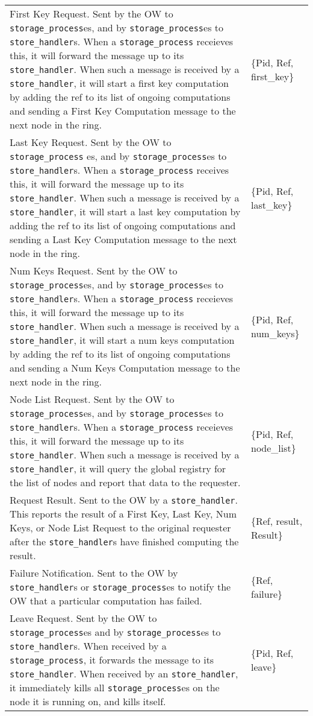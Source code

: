 \documentclass[12pt,letterpaper]{article}
\renewcommand{\tt}[1]{\texttt{#1}}
\newcommand{\sh}{\tt{store\_handler}}
\renewcommand{\sp}{\tt{storage\_process}}
\begin{document}
\begin{longtable}{p{4.5in}T}
First Key Request. Sent by the OW to \sp es, and by \sp es to \sh s. When a \sp{} receieves this, it will forward the message up to its \sh. When such a message is received by a \sh, it will start a first key computation by adding the ref to its list of ongoing computations and sending a First Key Computation message to the next node in the ring. &
\{Pid, Ref, first\_key\} \\

Last Key Request. Sent by the OW to \sp{} es, and by \sp es to \sh s. When a \sp{} receives this, it will forward the message up to its \sh. When such a message is received by a \sh, it will start a last key computation by adding the ref to its list of ongoing computations and sending a Last Key Computation message to the next node in the ring. &
\{Pid, Ref, last\_key\} \\

Num Keys Request. Sent by the OW to \sp es, and by \sp es to \sh s. When a \sp{} receieves this, it will forward the message up to its \sh. When such a message is received by a \sh, it will start a num keys computation by adding the ref to its list of ongoing computations and sending a Num Keys Computation message to the next node in the ring. &
\{Pid, Ref, num\_keys\} \\

Node List Request. Sent by the OW to \sp es, and by \sp es to \sh s. When a \sp{} receieves this, it will forward the message up to its \sh.  When such a message is received by a \sh, it will query the global registry for the list of nodes and report that data to the requester. &
\{Pid, Ref, node\_list\} \\

Request Result. Sent to the OW by a \sh. This reports the result of a First Key, Last Key, Num Keys, or Node List Request to the original requester after the \sh s have finished computing the result. &
\{Ref, result, Result\} \\

Failure Notification. Sent to the OW by \sh s or \sp es to notify the OW that a particular computation has failed. &
\{Ref, failure\} \\

Leave Request. Sent by the OW to \sp es and by \sp es to \sh s. When received by a \sp, it forwards the message to its \sh. When received by an \sh, it immediately kills all \sp es on the node it is running on, and kills itself. &
\{Pid, Ref, leave\} \\


\end{longtable}
\end{document}

